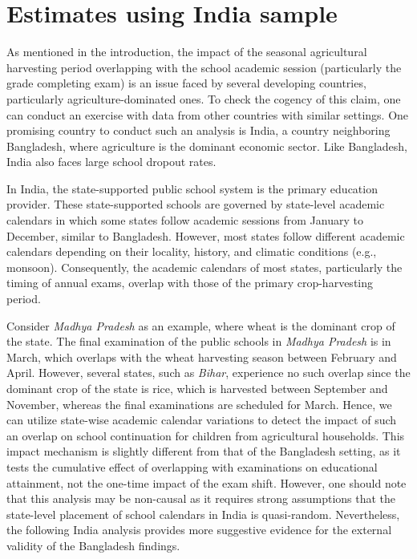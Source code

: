 \documentclass[12pt,letterpaper]{article}
\newcommand{\0}{\ensuremath{\mbox{\boldmath $0$}}}
\begin{document}
\section{Estimates using India sample}

As mentioned in the introduction, the impact of the seasonal agricultural harvesting period overlapping with the school academic session (particularly the grade completing exam) is an issue faced by several developing countries, particularly agriculture-dominated ones. To check the cogency of this claim, one can conduct an exercise with data from other countries with similar settings. One promising country to conduct such an analysis is India, a country neighboring Bangladesh, where agriculture is the dominant economic sector. Like Bangladesh, India also faces large school dropout rates.

In India, the state-supported public school system is the primary education provider. These state-supported schools are governed by state-level academic calendars in which some states follow academic sessions from January to December, similar to Bangladesh. However, most states follow different academic calendars depending on their locality, history, and climatic conditions (e.g., monsoon). Consequently, the academic calendars of most states, particularly the timing of annual exams, overlap with those of the primary crop-harvesting period. 

Consider \textit{Madhya Pradesh} as an example, where wheat is the dominant crop of the state. The final examination of the public schools in \textit{Madhya Pradesh} is in March, which overlaps with the wheat harvesting season between February and April. However, several states, such as \textit{Bihar}, experience no such overlap since the dominant crop of the state is rice, which is harvested between September and November, whereas the final examinations are scheduled for March. Hence, we can utilize state-wise academic calendar variations to detect the impact of such an overlap on school continuation for children from agricultural households. This impact mechanism is slightly different from that of the Bangladesh setting, as it tests the cumulative effect of overlapping with examinations on educational attainment, not the one-time impact of the exam shift. However, one should note that this analysis may be non-causal as it requires strong assumptions that the state-level placement of school calendars in India is quasi-random. Nevertheless, the following India analysis provides more suggestive evidence for the external validity of the Bangladesh findings. 
\end{document}
